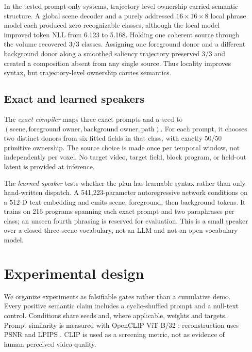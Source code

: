 \documentclass{article}
\begin{document}
In the tested prompt-only systems, trajectory-level ownership carried semantic structure. A global
scene decoder and a purely addressed $16\times16\times8$ local phrase model each produced zero
recognizable classes, although the local model improved token NLL from 6.123 to 5.168. Holding one
coherent source through the
volume recovered 3/3 classes. Assigning one foreground donor and a different background donor along
a smoothed saliency trajectory preserved 3/3 and created a composition absent from any single
source. Thus locality improves syntax, but trajectory-level ownership carries semantics.

\subsection{Exact and learned speakers}

The \emph{exact compiler} maps three exact prompts and a seed to
$(\text{scene},\text{foreground owner},\text{background owner},\text{path})$. For each prompt, it
chooses two distinct donors from six fitted fields in that class, with exactly 50/50 primitive
ownership. The source choice is made once per temporal window, not independently per voxel. No
target video, target field, block program, or held-out latent is provided at inference.

The \emph{learned speaker} tests whether the plan has learnable syntax rather than only hand-written
dispatch. A 541,223-parameter autoregressive network conditions on a 512-D text embedding and emits
scene, foreground, then background tokens. It trains on 216 programs spanning each exact prompt and
two paraphrases per class; an unseen fourth phrasing is reserved for evaluation. This is a small
speaker over a closed three-scene vocabulary, not an LLM and not an open-vocabulary model.

\section{Experimental design}
\label{sec:experiments}

We organize experiments as falsifiable gates rather than a cumulative demo. Every positive semantic
claim includes a cyclic-shuffled prompt and a null-text control. Conditions share seeds and, where
applicable, weights and targets. Prompt similarity is measured with OpenCLIP ViT-B/32
\cite{radford2021clip}; reconstruction uses PSNR and LPIPS \cite{zhang2018lpips}. CLIP is used as a
screening metric, not as evidence of human-perceived video quality.
\end{document}
